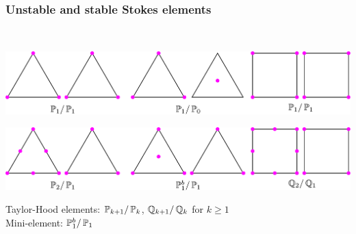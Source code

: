 \begin{frame}
    \frametitle{Unstable and stable Stokes elements}
 \\
        \begin{center}
            \includegraphics[width=1.0\textwidth]{pdf/stokes_unstable_elements.pdf}
        \end{center}
        \begin{center}
            \includegraphics[width=1.0\textwidth]{pdf/stokes_stable_elements.pdf}
        \end{center}
       Taylor-Hood
        elements:  $\mathbb{P}_{k+1} /\,\mathbb{P}_{k}$, $\mathbb{Q}_{k+1}/\,\mathbb{Q}_k$ for $k\geqslant 1$  \\
        Mini-element:  $\mathbb{P}_1^b/\,\mathbb{P}_1$
\end{frame}

